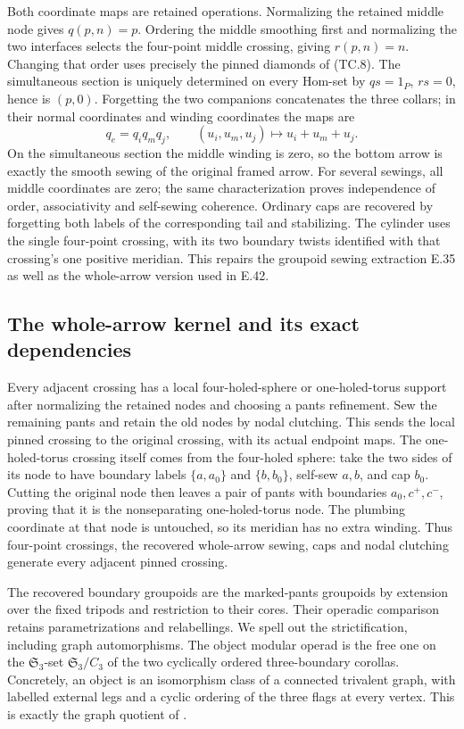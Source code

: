 Both coordinate maps are retained operations.  Normalizing the retained
middle node gives $q(p,n)=p$.  Ordering the middle smoothing first and
normalizing the two interfaces selects the four-point middle crossing,
giving $r(p,n)=n$.  Changing that order uses precisely the pinned
diamonds of (TC.8).  The simultaneous section is uniquely determined
on every Hom-set by $qs=1_P$, $rs=0$, hence is $(p,0)$.
Forgetting the two companions concatenates the three collars; in their
normal coordinates and winding coordinates the maps are
\[
                   q_e=q_iq_mq_j,
                 \qquad(u_i,u_m,u_j)\mapsto u_i+u_m+u_j.
\]
On the simultaneous section the middle winding is zero, so the bottom
arrow is exactly the smooth sewing of the original framed arrow.
For several sewings, all middle coordinates are zero; the same
characterization proves independence of order, associativity and
self-sewing coherence.  Ordinary caps are recovered by forgetting
both labels of the corresponding tail and stabilizing.  The cylinder
uses the single four-point crossing, with its two boundary twists
identified with that crossing's one positive meridian.  This repairs
the groupoid sewing extraction E.35 as well as the whole-arrow version
used in E.42.

\subsection{The whole-arrow kernel and its exact dependencies}

Every adjacent crossing has a local four-holed-sphere or one-holed-torus
support after normalizing the retained nodes and choosing a pants
refinement.  Sew the remaining pants and retain the old nodes by nodal
clutching.  This sends the local pinned crossing to the original
crossing, with its actual endpoint maps.  The one-holed-torus crossing
itself comes from the four-holed sphere: take the two sides of its
node to have boundary labels $\{a,a_0\}$ and $\{b,b_0\}$,
self-sew $a,b$, and cap $b_0$.  Cutting the original node then leaves
a pair of pants with boundaries $a_0,c^+,c^-$, proving that it is the
nonseparating one-holed-torus node.  The plumbing coordinate at that
node is untouched, so its meridian has no extra winding.
Thus four-point crossings, the recovered whole-arrow sewing, caps and
nodal clutching generate every adjacent pinned crossing.

The recovered boundary groupoids are the marked-pants groupoids by
extension over the fixed tripods and restriction to their cores.
Their operadic comparison retains parametrizations and relabellings.
We spell out the strictification, including graph automorphisms.
The object modular operad is the free one on the
$\mathfrak S_3$-set $\mathfrak S_3/C_3$ of the two cyclically ordered
three-boundary corollas.  Concretely, an object is an isomorphism class
of a connected trivalent graph, with labelled external legs and a
cyclic ordering of the three flags at every vertex.  This is exactly
the graph quotient of
\cite[Definitions~2.24 and 3.1]{ET_BonattoRobertson2026}.

